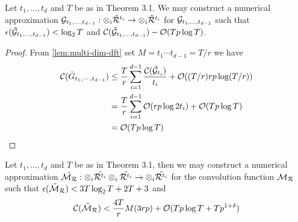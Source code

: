 \begin{proposition}
    Let $t_1, \ldots, t_d$ and $T$ be as in Theorem 3.1. We may construct a numerical approximation $\mathcal G_{t_1, \ldots, t_{d-1}}: \otimes_i \tilde{\mathcal R}^{t_i} \to \otimes_i \tilde{\mathcal R}^{t_i}$ for $\mathcal G_{t_1, \ldots, t_{d-1}}$ such that $\epsilon(\tilde{\mathcal G}_{t_1, \ldots, t_{d-1}}) < \log_2 T$ and $\mathcal C(\tilde{\mathcal G}_{t_1, \ldots, t_{d-1}}) - \mathcal O(Tp \log T)$.
\end{proposition}

\begin{proof}
    From \ref{lem:multi-dim-dft} set $M = t_1\cdots t_{d-1} = T/r$ we have
    \begin{align*}
        \mathcal C(\tilde{G}_{t_1, \cdots, t_{d-1}}) &\leq \frac{T}{r} \sum^{d-1}_{i=1} \frac{\mathcal C(\tilde{\mathcal G}_{t_i})}{t_i} + \mathcal O((T/r)rp\log (T / r))\\
                                                &= \frac{T}{r}\sum^{d-1}_{i=1}\mathcal O(rp\log 2t_i) + \mathcal O(Tp \log T)\\
                                                &= \mathcal O(Tp \log T)
    \end{align*}
\end{proof}

\begin{proposition}
    Let $t_1, \ldots, t_d$ and $T$ be as in Theorem 3.1, then we may construct a numerical approximation $\tilde{\mathcal M_{\mathcal R}}: \otimes_i \tilde{\mathcal R^{t_i}} \otimes_i \tilde{\mathcal R^{t_i}} \to \otimes_i \tilde{\mathcal R^{t_i}}$ for the convolution function $\mathcal M_{\mathcal R}$ such that $\epsilon(\tilde{\mathcal M}_{\mathcal R}) < 3T \log_2 T + 2T + 3$ and
    \[
        \mathcal C(\tilde{\mathcal M}_{\mathcal R}) < \frac{4T}{r}M(3rp) + \mathcal O(Tp \log T + T p^{1 + \delta})
    \]
\end{proposition}

